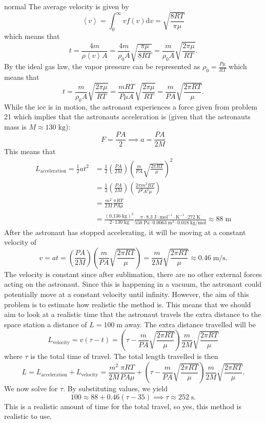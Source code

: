 \begin{solution}{normal}
The average velocity is given by 
\[\left<v\right> = \int_{0}^{\infty} v f(v)\text{d}v = \sqrt{\frac{8RT}{\pi \mu}}\]
which means that 
\[t = \frac{4m}{\rho \left<v\right> A} = \frac{4m}{\rho_0 A}\sqrt{\frac{\pi \mu}{8R T}} = \frac{m}{\rho_0 A}\sqrt{\frac{2\pi \mu}{RT}}.\]
By the ideal gas law, the vapor pressure can be represented as $\rho_0 = \frac{P\mu}{RT}$ which means that 
\[t = \frac{m}{\rho_0 A}\sqrt{\frac{2\pi \mu}{RT}} = \frac{mRT}{P\mu A}\sqrt{\frac{2\pi \mu}{RT}}= \frac{m}{PA}\sqrt{\frac{2\pi RT}{\mu}}.\]
While the ice is in motion, the astronaut experiences a force given from problem 21 which implies that the astronauts acceleration is (given that the astronauts mass is $M \approx 130\;\mathrm{kg}$):
\[F = \frac{PA}{2}\implies a = \frac{PA}{2M}\]
This means that 
\begin{align*}
L_{\text{acceleration}} = \frac{1}{2}at^2 &= \frac{1}{2}\left(\frac{PA}{2M}\right)\left(\frac{m}{PA}\sqrt{\frac{2\pi RT}{\mu}}\right)^2\\
&= \frac{1}{2}\left(\frac{PA}{2M}\right)\left(\frac{2\pi m^2 RT}{P^2 A^2 \mu}\right) \\
&= \frac{m^2}{2M}\frac{\pi RT}{PA\mu} \\
&= \frac{(0.136\;\mathrm{kg})^2}{2\cdot 130\;\mathrm{kg}}\frac{\pi \cdot 8.3\;\mathrm{J\cdot mol^{-1}\cdot K^{-1}}\cdot 272\;\mathrm{K}}{550\;\mathrm{Pa}\cdot 0.0063\;\mathrm{m^2}\cdot 0.018\;\mathrm{kg/mol}} \approx 88\;\mathrm{m}
\end{align*}
After the astronaut has stopped accelerating, it will be moving at a constant velocity of 
\[v = at = \left(\frac{PA}{2M}\right)\left(\frac{m}{PA}\sqrt{\frac{2\pi RT}{\mu}}\right) = \frac{m}{2M}\sqrt{\frac{2\pi RT}{\mu}} \approx 0.46\;\mathrm{m/s}.\]
The velocity is constant since after sublimation, there are no other external forces acting on the astronaut. Since this is happening in a vacuum, the astronaut could potentially move at a constant velocity until infinity. However, the aim of this problem is to estimate how realistic the method is. This means that we should aim to look at a realistic time that the astronaut travels the extra distance to the space station a distance of $L = 100\;\mathrm{m}$ away. The extra distance travelled will be 
\[L_{\text{velocity}} = v (\tau - t) = \left(\tau - \frac{m}{PA}\sqrt{\frac{2\pi RT}{\mu}}\right)\frac{m}{2M}\sqrt{\frac{2\pi RT}{\mu}}\]
where $\tau$ is the total time of travel. The total length travelled is then 
\[L = L_{\text{acceleration}} + L_{\text{velocity}} = \frac{m^2}{2M}\frac{\pi RT}{PA\mu} + \left(\tau - \frac{m}{PA}\sqrt{\frac{2\pi RT}{\mu}}\right)\frac{m}{2M}\sqrt{\frac{2\pi RT}{\mu}}.\]
We now solve for $\tau$. By substituting values, we yield
\[100 \approx 88 + 0.46(\tau - 35)\implies \tau \approx 252\;\mathrm{s}.\]
This is a realistic amount of time for the total travel, so yes, this method is realistic to use. 


\end{solution}